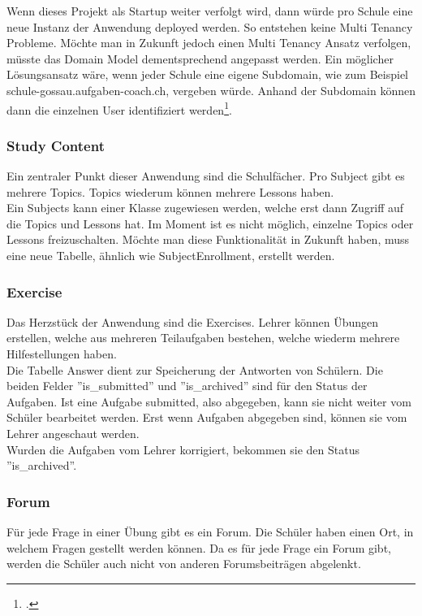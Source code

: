 Wenn dieses Projekt als Startup weiter verfolgt wird, dann würde pro Schule eine neue Instanz der Anwendung deployed werden. So entstehen keine Multi Tenancy Probleme. Möchte man in Zukunft jedoch einen Multi Tenancy Ansatz verfolgen, müsste das Domain Model dementsprechend angepasst werden. Ein möglicher Lösungsansatz wäre, wenn jeder Schule eine eigene Subdomain, wie zum Beispiel schule-gossau.aufgaben-coach.ch, vergeben würde. Anhand der Subdomain können dann die einzelnen User identifiziert werden\footcite{django:multi_tenancy}.

\subsubsection*{Study Content}
Ein zentraler Punkt dieser Anwendung sind die Schulfächer. Pro Subject gibt es mehrere Topics. Topics wiederum können mehrere Lessons haben. \\ 
Ein Subjects kann einer Klasse zugewiesen werden, welche erst dann Zugriff auf die Topics und Lessons hat. Im Moment ist es nicht möglich, einzelne Topics oder Lessons freizuschalten. Möchte man diese Funktionalität in Zukunft haben, muss eine neue Tabelle, ähnlich wie SubjectEnrollment, erstellt werden.

\subsubsection*{Exercise}
Das Herzstück der Anwendung sind die Exercises. Lehrer können Übungen erstellen, welche aus mehreren Teilaufgaben bestehen, welche wiederm mehrere Hilfestellungen haben. \\
Die Tabelle Answer dient zur Speicherung der Antworten von Schülern. Die beiden Felder ''is\_submitted'' und ''is\_archived'' sind für den Status der Aufgaben. Ist eine Aufgabe submitted, also abgegeben, kann sie nicht weiter vom Schüler bearbeitet werden. Erst wenn Aufgaben abgegeben sind, können sie vom Lehrer angeschaut werden. \\ 
Wurden die Aufgaben vom Lehrer korrigiert, bekommen sie den Status ''is\_archived''.

\subsubsection*{Forum}
Für jede Frage in einer Übung gibt es ein Forum. Die Schüler haben einen Ort, in welchem Fragen gestellt werden können. Da es für jede Frage ein Forum gibt, werden die Schüler auch nicht von anderen Forumsbeiträgen abgelenkt.